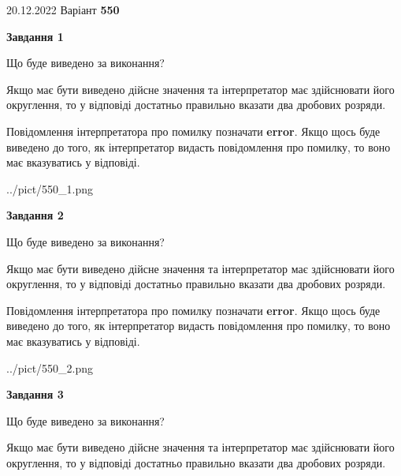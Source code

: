\documentclass[12pt, ukrainian]{article}
\begin{document}
{20.12.2022 Варіант \No \textbf { 550 }\par}
{
\begin {Large}

{\begin {center}\textbf{Завдання 1}\end {center}}\par
Що буде виведено за виконання? \par

Якщо має бути виведено дійсне значення та інтерпретатор має здійснювати його округлення, 
то у відповіді достатньо правильно вказати два дробових розряди.

Повідомлення інтерпретатора про помилку позначати \textbf{error}.
Якщо щось буде виведено до того, як інтерпретатор видасть повідомлення про помилку, 
то воно має вказуватись у відповіді. \par

\begin{center}
	{../pict/550_1.png}
\end{center}
\newpage

{\begin {center}\textbf{Завдання 2}\end {center}}\par
Що буде виведено за виконання? \par

Якщо має бути виведено дійсне значення та інтерпретатор має здійснювати його округлення, 
то у відповіді достатньо правильно вказати два дробових розряди.

Повідомлення інтерпретатора про помилку позначати \textbf{error}.
Якщо щось буде виведено до того, як інтерпретатор видасть повідомлення про помилку, 
то воно має вказуватись у відповіді. \par

\begin{center}
	{../pict/550_2.png}
\end{center}
\newpage

{\begin {center}\textbf{Завдання 3}\end {center}}\par
Що буде виведено за виконання? \par

Якщо має бути виведено дійсне значення та інтерпретатор має здійснювати його округлення, 
то у відповіді достатньо правильно вказати два дробових розряди.


\end{Large}}
\end{document}
